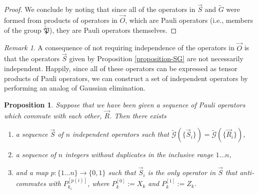 \documentclass{amsbook}
\theoremstyle{plain}
\newtheorem{proposition}{Proposition}
\theoremstyle{definition}
\theoremstyle{remark}
\newtheorem{remark}{Remark}
\newcommand{\lst}{\vec}
\newcommand{\set}{\tilde}
\newcommand{\genfun}{\tilde{\mathcal{G}}}
\newcommand{\pauligroup}{{\set{\mathfrak{P}}}}
\newcommand{\paren}[1]{\left(#1\right)}
\begin{document}
\begin{proof}
We conclude by noting that since all of the operators in $\lst S$ and $\set G$ were formed from products of operators in $\lst O$, which are Pauli operators (i.e., members of the group $\pauligroup$), they are Pauli operators themselves.
\end{proof}
\begin{remark}
A consequence of not requiring independence of the operators in $\lst O$ is that the operators $\lst S$ given by Proposition \ref{proposition-SG} are not necessarily independent.  Happily, since all of these operators can be expressed as tensor products of Pauli operators, we can construct a set of independent operators by performing an analog of Gaussian elimination.
\end{remark}

\begin{proposition}
\label{make-independent-using-elimination}
Suppose that we have been given a sequence of Pauli operators which commute with each other, $\lst R$.  Then there exists
\begin{enumerate}
\item a sequence $\lst S$ of $n$ independent operators such that $\genfun\paren{\{\lst S_i\}}=\genfun\paren{\{\lst R_i\}}$,
\item a sequence of $n$ integers without duplicates in the inclusive range $1\dots n$,
\item and a map $p:\{1\dots n\} \to \{0,1\}$ such that $\lst S_i$ is the only operator in $\lst S$ that anti-commutes with $P_{k_i}^{[p(i)]}$, where $P_k^{[0]}:=X_k$ and $P_k^{[1]}:=Z_k$.
\end{enumerate}
\end{proposition}
\end{document}
